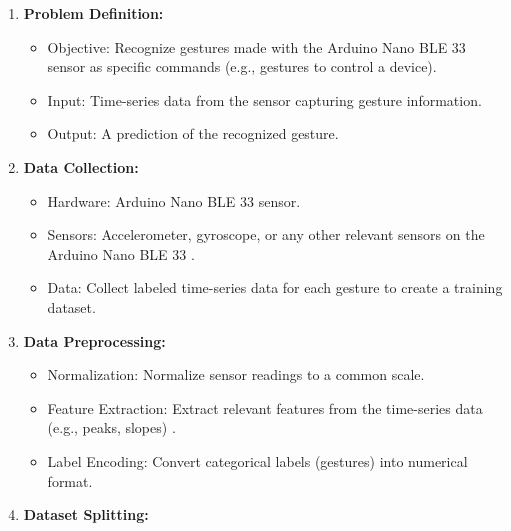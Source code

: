 \begin{enumerate}
	
	\item \textbf{Problem Definition:}
	
	\begin{itemize}
		
		\item Objective: Recognize gestures made with the Arduino Nano BLE 33 sensor as specific commands (e.g., gestures to control a device).
		
		\item Input: Time-series data from the sensor capturing gesture information.
		
		\item Output: A prediction of the recognized gesture.
		
	\end{itemize}
	
	\item \textbf{Data Collection:}
	
	\begin{itemize}
		
		\item Hardware: Arduino Nano BLE 33 sensor.
		
		\item Sensors: Accelerometer, gyroscope, or any other relevant sensors on the Arduino Nano BLE 33 \cite{Mardiyanto:2017}.
		
		\item Data: Collect labeled time-series data for each gesture to create a training dataset.
		
	\end{itemize}
	
	\item \textbf{Data Preprocessing:}
	
	\begin{itemize}
		
		\item Normalization: Normalize sensor readings to a common scale.
		
		\item Feature Extraction: Extract relevant features from the time-series data (e.g., peaks, slopes) \cite{Cong:2022}.
		
		\item Label Encoding: Convert categorical labels (gestures) into numerical format.
		
	\end{itemize}
	
	\item \textbf{Dataset Splitting:}
	

\end{enumerate}

